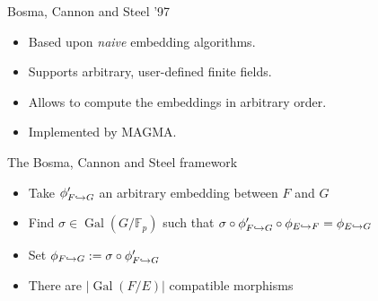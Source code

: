 \documentclass[francais]{beamer}
\DeclareMathOperator{\Gal}{Gal}
\begin{document}
\begin{frame}{Bosma, Cannon and Steel '97~\cite{bosma+cannon+steel97}}
  \begin{itemize}
    \item Based upon \emph{naive} embedding algorithms.
    \item Supports arbitrary, user-defined finite fields.
    \item Allows to compute the embeddings in arbitrary order.
    \item Implemented by MAGMA.
  \end{itemize}
\end{frame}

\begin{frame}{The Bosma, Cannon and Steel framework}
  \begin{figure}
    \centering
  \end{figure}
  \begin{itemize}
    \item Take $\phi_{F\hookrightarrow G}'$ an arbitrary embedding between $F$ and
      $G$
    \item Find $\sigma\in\Gal(G/\mathbb{F}_p)$ such that
      $\sigma\circ\phi_{F\hookrightarrow G}'\circ\phi_{E\hookrightarrow F}=\phi_{E\hookrightarrow G}$
    \item Set $\phi_{F\hookrightarrow G}:=\sigma\circ\phi_{F\hookrightarrow G}'$
    \item There are $|\Gal(F/E)|$ compatible morphisms
  \end{itemize}
\end{frame}
\end{document}
